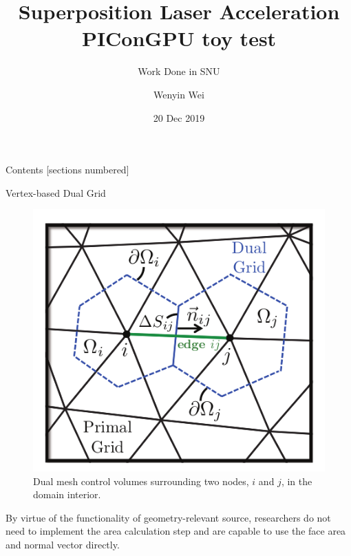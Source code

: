 \documentclass[10pt, compress,british,xcolor={svgnames,dvipsnames,x11names},trans]{beamer}
\title{Superposition Laser Acceleration PIConGPU toy test}
\subtitle{Work Done in SNU}
\date{20 Dec 2019}
\author{Wenyin Wei}
\institute{
Engineering Physics Department\\
Tsinghua University Beijing
}
\begin{document}
\maketitle

\begin{frame}{Contents}
[sections numbered]
\tableofcontents[hideallsubsections]
\end{frame}





\begin{frame}{Vertex-based Dual Grid}
\begin{figure}
    \centering
    \includegraphics[width=0.5\linewidth]{figures/DualMeshControlVolume.png}
    \caption{Dual mesh control volumes surrounding two nodes, $i$ and $j$, in the domain interior.}
\end{figure}


By virtue of the functionality of geometry-relevant source, researchers do not need to implement the area calculation step and are capable to use the face area and normal vector directly.

\end{frame}



% 
% 


% 

% 
% 
% 


% 

\end{document}
